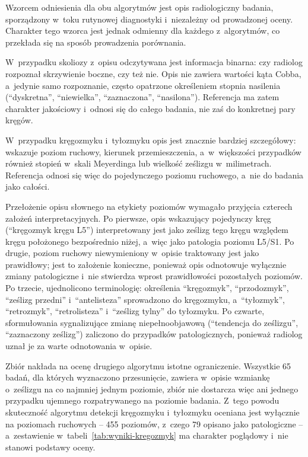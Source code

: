 Wzorcem odniesienia dla obu algorytmów jest opis radiologiczny badania, sporządzony w~toku rutynowej diagnostyki i~niezależny od prowadzonej oceny.
Charakter tego wzorca jest jednak odmienny dla każdego z~algorytmów, co przekłada się na sposób prowadzenia porównania.

W~przypadku skoliozy z~opisu odczytywana jest informacja binarna: czy radiolog rozpoznał skrzywienie boczne, czy też nie.
Opis nie zawiera wartości kąta Cobba, a~jedynie samo rozpoznanie, często opatrzone określeniem stopnia nasilenia (\enquote{dyskretna}, \enquote{niewielka}, \enquote{zaznaczona}, \enquote{nasilona}).
Referencja ma zatem charakter jakościowy i~odnosi się do całego badania, nie zaś do konkretnej pary kręgów.

W~przypadku kręgozmyku i~tyłozmyku opis jest znacznie bardziej szczegółowy: wskazuje poziom ruchowy, kierunek przemieszczenia, a~w~większości przypadków również stopień w~skali Meyerdinga lub wielkość ześlizgu w~milimetrach.
Referencja odnosi się więc do pojedynczego poziomu ruchowego, a~nie do badania jako całości.

Przełożenie opisu słownego na etykiety poziomów wymagało przyjęcia czterech założeń interpretacyjnych.
Po pierwsze, opis wskazujący pojedynczy kręg (\enquote{kręgozmyk kręgu L5}) interpretowany jest jako ześlizg tego kręgu względem kręgu położonego bezpośrednio niżej, a~więc jako patologia poziomu L5/S1.
Po drugie, poziom ruchowy niewymieniony w~opisie traktowany jest jako prawidłowy; jest to założenie konieczne, ponieważ opis odnotowuje wyłącznie zmiany patologiczne i~nie stwierdza wprost prawidłowości pozostałych poziomów.
Po trzecie, ujednolicono terminologię: określenia \enquote{kręgozmyk}, \enquote{przodozmyk}, \enquote{ześlizg przedni} i~\enquote{antelisteza} sprowadzono do kręgozmyku, a~\enquote{tyłozmyk}, \enquote{retrozmyk}, \enquote{retrolisteza} i~\enquote{ześlizg tylny} do tyłozmyku.
Po czwarte, sformułowania sygnalizujące zmianę niepełnoobjawową (\enquote{tendencja do ześlizgu}, \enquote{zaznaczony ześlizg}) zaliczono do przypadków patologicznych, ponieważ radiolog uznał je za warte odnotowania w~opisie.

Zbiór nakłada na ocenę drugiego algorytmu istotne ograniczenie.
Wszystkie 65 badań, dla których wyznaczono przesunięcie, zawiera w~opisie wzmiankę o~ześlizgu na co najmniej jednym poziomie, zbiór nie dostarcza więc ani jednego przypadku ujemnego rozpatrywanego na poziomie badania.
Z~tego powodu skuteczność algorytmu detekcji kręgozmyku i~tyłozmyku oceniana jest wyłącznie na poziomach ruchowych -- 455 poziomów, z~czego 79 opisano jako patologiczne -- a~zestawienie w~tabeli~\ref{tab:wyniki-kregozmyk} ma charakter poglądowy i~nie stanowi podstawy oceny.

